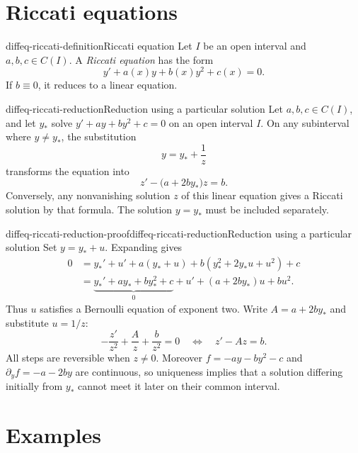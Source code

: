 \documentclass[preview]{standalone}
\begin{document}
\genpage
\section{Riccati equations}

\begin{snippetdefinition}{diffeq-riccati-definition}{Riccati equation}
    Let \(I\) be an open interval and \(a,b,c\in C(I)\).
    A \emph{Riccati equation} has the form
    \[
        y'+a(x)y+b(x)y^2+c(x)=0.
    \]
    If \(b\equiv0\), it reduces to a linear equation.
\end{snippetdefinition}

\begin{snippettheorem}{diffeq-riccati-reduction}{Reduction using a particular solution}
    Let \(a,b,c\in C(I)\), and let \(y_*\) solve
    \(y'+ay+by^2+c=0\) on an open interval \(I\).
    On any subinterval where \(y\neq y_*\), the substitution
    \[
        y=y_*+\frac1z
    \]
    transforms the equation into
    \[
        z'-\bigl(a+2by_*\bigr)z=b.
    \]
    Conversely, any nonvanishing solution \(z\) of this linear equation
    gives a Riccati solution by that formula.
    The solution \(y=y_*\) must be included separately.
\end{snippettheorem}

\begin{snippetproof}{diffeq-riccati-reduction-proof}{diffeq-riccati-reduction}{Reduction using a particular solution}
    Set \(y=y_*+u\). Expanding gives
    \begin{align*}
        0&=y_*'+u'+a(y_*+u)+b(y_*^2+2y_*u+u^2)+c\\
         &=\underbrace{y_*'+ay_*+by_*^2+c}_{0}
           +u'+(a+2by_*)u+bu^2.
    \end{align*}
    Thus \(u\) satisfies a Bernoulli equation of exponent two.
    Write \(A=a+2by_*\) and substitute \(u=1/z\):
    \[
        -\frac{z'}{z^2}+\frac A z+\frac b{z^2}=0
        \quad\Longleftrightarrow\quad z'-Az=b.
    \]
    All steps are reversible when \(z\neq0\).
    Moreover \(f=-ay-by^2-c\) and \(\partial_yf=-a-2by\) are continuous,
    so uniqueness implies that a solution differing initially from \(y_*\)
    cannot meet it later on their common interval.
\end{snippetproof}

\section{Examples}
\end{document}
